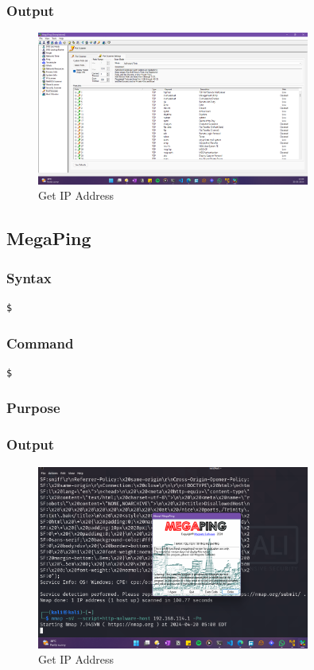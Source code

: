 \documentclass[11pt]{article}
\begin{document}
\subsubsection*{Output}
\begin{figure}[H]
    \centering
    \includegraphics[width=0.8\textwidth]{megaping .png}
    \caption{Get IP Address}
    \label{fig:1}
\end{figure}
\subsection{MegaPing}

\subsubsection*{Syntax}
\begin{verbatim}
$
\end{verbatim}

\subsubsection*{Command}
\begin{verbatim}
$
\end{verbatim}

\subsubsection*{Purpose}

\subsubsection*{Output}
\begin{figure}[H]
    \centering
    \includegraphics[width=0.8\textwidth]{megaping (1).png}
    \caption{Get IP Address}
    \label{fig:1}
\end{figure}
\end{document}

